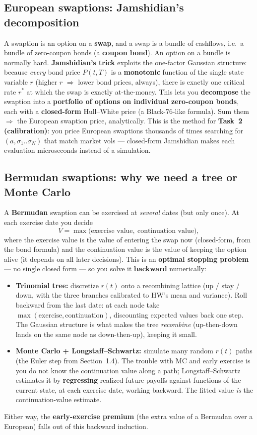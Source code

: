 \documentclass[11pt]{article}
\begin{document}
\subsection{European swaptions: Jamshidian's decomposition}
A swaption is an option on a \textbf{swap}, and a swap is a bundle of cashflows, i.e.\ a
bundle of zero-coupon bonds (a \textbf{coupon bond}). An option on a bundle is normally
hard. \textbf{Jamshidian's trick} exploits the one-factor Gaussian structure: because
\emph{every} bond price $P(t,T)$ is a \textbf{monotonic} function of the single state
variable $r$ (higher $r$ $\Rightarrow$ lower bond prices, always), there is exactly one
critical rate $r^\ast$ at which the swap is exactly at-the-money. This lets you
\textbf{decompose} the swaption into a \textbf{portfolio of options on individual
zero-coupon bonds}, each with a \textbf{closed-form} Hull--White price (a Black-76-like
formula). Sum them $\Rightarrow$ the European swaption price, analytically. This is the
method for \textbf{Task~2 (calibration)}: you price European swaptions thousands of times
searching for $(a,\sigma_1..\sigma_N)$ that match market vols --- closed-form Jamshidian
makes each evaluation microseconds instead of a simulation.

\subsection{Bermudan swaptions: why we need a tree or Monte Carlo}
A \textbf{Bermudan} swaption can be exercised at \emph{several} dates (but only once). At
each exercise date you decide
\[
  V = \max\big(\text{exercise value},\ \text{continuation value}\big),
\]
where the exercise value is the value of entering the swap now (closed-form, from the
bond formula) and the continuation value is the value of keeping the option alive (it
depends on all later decisions). This is an \textbf{optimal stopping problem} --- no
single closed form --- so you solve it \textbf{backward} numerically:
\begin{itemize}[leftmargin=1.4em]
  \item \textbf{Trinomial tree:} discretize $r(t)$ onto a recombining lattice (up / stay
        / down, with the three branches calibrated to HW's mean and variance). Roll
        backward from the last date: at each node take $\max(\text{exercise},
        \text{continuation})$, discounting expected values back one step. The Gaussian
        structure is what makes the tree \emph{recombine} (up-then-down lands on the same
        node as down-then-up), keeping it small.
  \item \textbf{Monte Carlo + Longstaff--Schwartz:} simulate many random $r(t)$ paths
        (the Euler step from Section~1.4). The trouble with MC and early exercise is you
        do not know the continuation value along a path; Longstaff--Schwartz estimates it
        by \textbf{regressing} realized future payoffs against functions of the current
        state, at each exercise date, working backward. The fitted value \emph{is} the
        continuation-value estimate.
\end{itemize}
Either way, the \textbf{early-exercise premium} (the extra value of a Bermudan over a
European) falls out of this backward induction.
\end{document}
